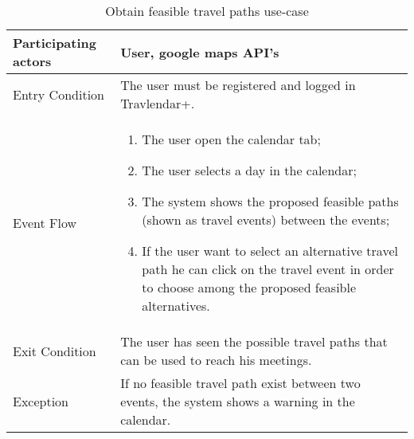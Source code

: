 \begin{table}[H]
	\begin{center}
		\begin{tabular}{ | p{} | p{} | }
		\hline
		Participating actors & User, google maps API’s\\
		\hline
		Entry Condition & The user must be registered and logged in Travlendar+.\\
		\hline
		Event Flow & 
			\begin{enumerate}
				\item The user open the calendar tab;
				\item The user selects a day in the calendar;
				\item The system shows the proposed feasible paths (shown as travel events) between the events;
				\item If the user want to select an alternative travel path he can click on the travel event in order to choose among the proposed feasible alternatives.
			\end{enumerate} \\
		\hline
		Exit Condition & The user has seen the possible travel paths that can be used to reach his meetings.\\
		\hline
		Exception & If no feasible travel path exist between two events, the system shows a warning in the calendar.\\ 
		\hline
		\end{tabular}
	\end{center}
	\caption{Obtain feasible travel paths use-case}
\end{table}